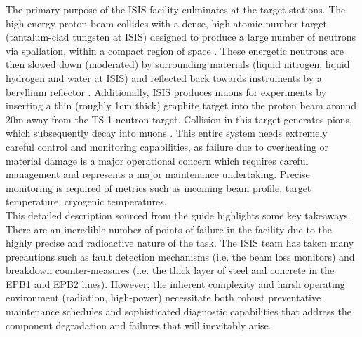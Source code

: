 \documentclass[10pt,oneside]{report}
\begin{document}
The primary purpose of the ISIS facility culminates at the target stations. The high-energy proton beam collides with a dense, high atomic number target (tantalum-clad tungsten at ISIS) designed to produce a large number of neutrons via spallation, within a compact region of space \cite{2021practicalguide}. These energetic neutrons are then slowed down (moderated) by surrounding materials (liquid nitrogen, liquid hydrogen and water at ISIS) and reflected back towards instruments by a beryllium reflector \cite{sharma2001nuclear, 2021practicalguide}. Additionally, ISIS produces muons for experiments by inserting a thin (roughly 1cm thick) graphite target into the proton beam around 20m away from the TS-1 neutron target. Collision in this target generates pions, which subsequently decay into muons \cite{2021practicalguide}.
This entire system needs extremely careful control and monitoring capabilities, as failure due to overheating or material damage is a major operational concern which requires careful management and represents a major maintenance undertaking. Precise monitoring is required of metrics such as incoming beam profile, target temperature, cryogenic temperatures. \\

\noindent This detailed description sourced from the guide highlights some key takeaways. There are an incredible number of points of failure in the facility due to the highly precise and radioactive nature of the task. The ISIS team has taken many precautions such as fault detection mechanisms (i.e. the beam loss monitors) and breakdown counter-measures (i.e. the thick layer of steel and concrete in the EPB1 and EPB2 lines). However, the inherent complexity and harsh operating environment (radiation, high-power) necessitate both robust preventative maintenance schedules and sophisticated diagnostic capabilities that address the component degradation and failures that will inevitably arise. 
\end{document}
